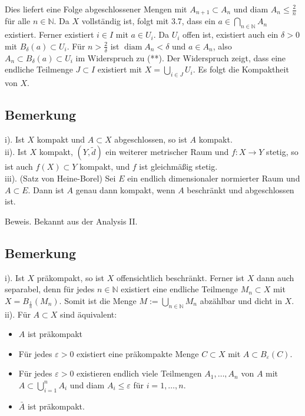 \documentclass[10pt, letterpaper]{article}
\begin{document}
Dies liefert eine Folge abgeschlossener Mengen mit $A_{n+1} \subset A_{n}$ und diam $A_{n} \leq \frac{2}{n}$ für alle $n \in \mathbb{N}$. Da $X$ vollständig ist, folgt mit 3.7, dass ein $a \in \bigcap_{n \in \mathbb{N}} A_{n}$ existiert. Ferner existiert $i \in I$ mit $a \in U_{i}$. Da $U_{i}$ offen ist, existiert auch ein $\delta>0$ mit $B_{\delta}(a) \subset U_{i}$. Für $n>\frac{2}{\delta}$ ist $\operatorname{diam} A_{n}<\delta$ und $a \in A_{n}$, also $A_{n} \subset B_{\delta}(a) \subset U_{i}$ im Widerspruch zu (**). Der Widerspruch zeigt, dass eine endliche Teilmenge $J \subset I$ existiert mit $X=\bigcup_{i \in J} U_{i}$. Es folgt die Kompaktheit von $X$.

\subsection*{Bemerkung}
i). Ist $X$ kompakt und $A \subset X$ abgeschlossen, so ist $A$ kompakt.\\
ii). Ist $X$ kompakt, $(Y, \tilde{d})$ ein weiterer metrischer Raum und $f: X \rightarrow Y$ stetig, so ist auch $f(X) \subset Y$ kompakt, und $f$ ist gleichmäßig stetig.\\
iii). (Satz von Heine-Borel) Sei $E$ ein endlich dimensionaler normierter Raum und $A \subset E$. Dann ist $A$ genau dann kompakt, wenn $A$ beschränkt und abgeschlossen ist.

Beweis. Bekannt aus der Analysis II.

\subsection*{Bemerkung}
i). Ist $X$ präkompakt, so ist $X$ offensichtlich beschränkt. Ferner ist $X$ dann auch separabel, denn für jedes $n \in \mathbb{N}$ existiert eine endliche Teilmenge $M_{n} \subset X$ mit $X=B_{\frac{1}{n}}\left(M_{n}\right)$. Somit ist die Menge $M:=\bigcup_{n \in \mathbb{N}} M_{n}$ abzählbar und dicht in $X$.\\
ii). Für $A \subset X$ sind äquivalent:

\begin{itemize}
  \item $A$ ist präkompakt
  \item Für jedes $\varepsilon>0$ existiert eine präkompakte Menge $C \subset X$ mit $A \subset B_{\varepsilon}(C)$.
  \item Für jedes $\varepsilon>0$ existieren endlich viele Teilmengen $A_{1}, \ldots, A_{n}$ von $A$ mit $A \subset \bigcup_{i=1}^{n} A_{i}$ und diam $A_{i} \leq \varepsilon$ für $i=1, \ldots, n$.
  \item $\bar{A}$ ist präkompakt.
\end{itemize}
\end{document}
